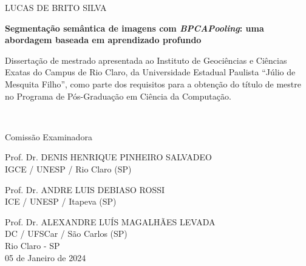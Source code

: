 \newpage
\thispagestyle{empty}

\begin{center}
    {LUCAS DE BRITO SILVA\\}
    
    \vspace{2cm}
    
    \textbf{Segmentação semântica de imagens com \textit{BPCAPooling}: uma abordagem baseada em aprendizado profundo}
    
    \vspace{4cm}
    
    \hspace{.45\linewidth}
    \begin{minipage}{.50\linewidth}
    \small
        Dissertação de mestrado apresentada ao Instituto de Geociências e Ciências Exatas do Campus de Rio Claro, da Universidade Estadual Paulista ``Júlio de Mesquita Filho'', como parte dos requisitos para a obtenção do título de mestre no Programa de Pós-Graduação em Ciência da Computação.
    \end{minipage} \\
    \normalsize
    
    \vspace{1cm}
    
    Comissão Examinadora\\
    
    \vspace{1cm}

    Prof. Dr. DENIS HENRIQUE PINHEIRO SALVADEO\\
    IGCE / UNESP / Rio Claro (SP)\\
    \vspace{0.5cm}


    Prof. Dr. ANDRE LUIS DEBIASO ROSSI\\
    ICE / UNESP / Itapeva (SP)\\
    \vspace{0.5cm}


    Prof. Dr. ALEXANDRE LUÍS MAGALHÃES LEVADA\\
    DC / UFSCar / São Carlos (SP) \\

    
    \vspace{2cm}
    Rio Claro - SP \\
    05 de Janeiro de 2024
\end{center}